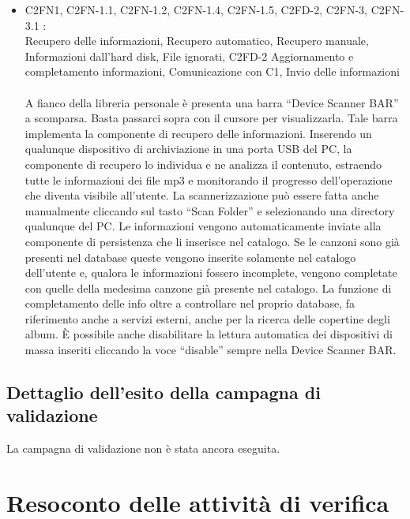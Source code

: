 \begin{itemize}
  \item C2FN1, C2FN-1.1, C2FN-1.2, C2FN-1.4, C2FN-1.5, C2FD-2, C2FN-3,
  C2FN-3.1 :\\
  Recupero delle informazioni, Recupero automatico, Recupero
  manuale, Informazioni dall'hard disk, File ignorati, C2FD-2 Aggiornamento e
  completamento informazioni, Comunicazione con C1, Invio delle informazioni\\
  \\A fianco della libreria personale \`e presenta una barra ``Device Scanner
  BAR'' a scomparsa. Basta passarci sopra con il cursore per visualizzarla. Tale
  barra implementa la componente di recupero delle informazioni. 
  Inserendo un qualunque dispositivo di archiviazione in una porta
  USB del PC, la componente di recupero lo individua e ne analizza il
  contenuto, estraendo tutte le informazioni dei file mp3 e monitorando il
  progresso dell'operazione che diventa visibile all'utente. La
  scannerizzazione pu\`o essere fatta anche manualmente cliccando sul tasto ``Scan Folder'' 
  e selezionando una directory qualunque del PC. Le informazioni vengono automaticamente inviate alla 
  componente di persistenza che li inserisce nel catalogo. Se le canzoni sono
  gi\`a presenti nel database queste vengono inserite solamente nel catalogo
  dell'utente e, qualora le informazioni fossero incomplete, vengono completate
  con quelle della medesima canzone gi\`a presente nel catalogo. La funzione di
  completamento delle info oltre a controllare nel proprio database, fa
  riferimento anche a servizi esterni, anche per la ricerca delle copertine
  degli album. \`E possibile anche disabilitare la lettura automatica dei
  dispositivi di massa inseriti cliccando la voce ``disable'' sempre nella Device Scanner BAR.
  
\end{itemize}


\section{Dettaglio dell'esito della campagna di validazione}
La campagna di validazione non \`e stata ancora eseguita.

\listoftables
{}
\listoffigures
{}



\appendix


\chapter{Resoconto delle attivit\`a di verifica}
\thispagestyle{fancy} %

